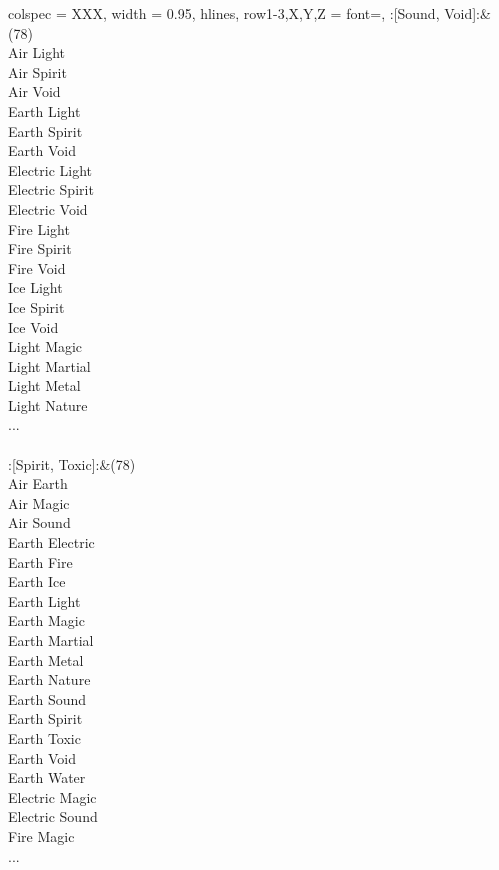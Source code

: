 \begin{longtblr}[
	caption = {2v2 Defending Weak},
	label = {2v2-Defending-Weak},
]{
	colspec = {XXX}, width = 0.95\linewidth,
	hlines,
	row{1-3,X,Y,Z} = {font=\bfseries},
}
	:[Sound, Void]:&{(78)\\
	Air Light \\
	Air Spirit \\
	Air Void \\
	Earth Light \\
	Earth Spirit \\
	Earth Void \\
	Electric Light \\
	Electric Spirit \\
	Electric Void \\
	Fire Light \\
	Fire Spirit \\
	Fire Void \\
	Ice Light \\
	Ice Spirit \\
	Ice Void \\
	Light Magic \\
	Light Martial \\
	Light Metal \\
	Light Nature \\
	...\\
	}\\

	:[Spirit, Toxic]:&{(78)\\
	Air Earth \\
	Air Magic \\
	Air Sound \\
	Earth Electric \\
	Earth Fire \\
	Earth Ice \\
	Earth Light \\
	Earth Magic \\
	Earth Martial \\
	Earth Metal \\
	Earth Nature \\
	Earth Sound \\
	Earth Spirit \\
	Earth Toxic \\
	Earth Void \\
	Earth Water \\
	Electric Magic \\
	Electric Sound \\
	Fire Magic \\
	...\\
	}\\


\end{longtblr}
